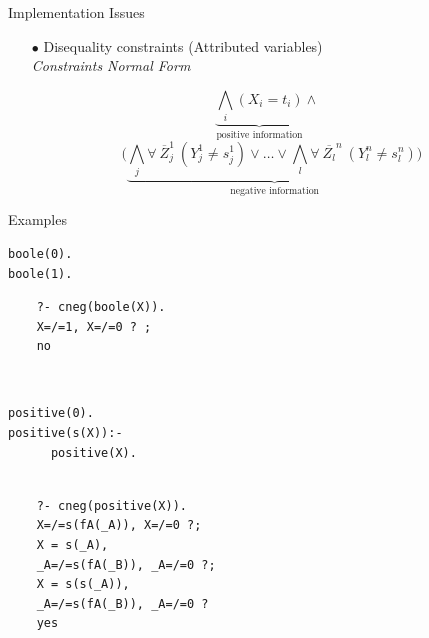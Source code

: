 \documentclass[pdf,slideColor,contemporain]{prosper}
\begin{document}
\begin{slide}{Implementation Issues}
     \begin{itemize}

        \item[$\bullet$] {\blue Disequality constraints} (Attributed
        variables) \\
        \emph{Constraints Normal Form}\\

\begin{small}

\[ \underbrace{\bigwedge_i (X_i = t_i)}_{\mbox{positive information}} \wedge~~~\] 
\[(
\underbrace{\bigwedge_j \forall~ \overline{Z}_j^1~(Y_j^1 \neq s_j^1)
\vee \ldots \vee \bigwedge_l \forall~ \overline{Z_l}^n~(Y_l^n \neq
s_l^n) )}_{\mbox{negative information}} \]


\end{small}

     \end{itemize}
\end{slide}
\begin{slide}{Examples}
\begin{small}

 \begin{minipage}{1.6in}
\begin{verbatim}
boole(0).
boole(1).
\end{verbatim}
\end{minipage}
\begin{minipage}{2in}
{\blue
\begin{verbatim} 
    ?- cneg(boole(X)).
    X=/=1, X=/=0 ? ;
    no
\end{verbatim} 
}
\end{minipage}\\
\vspace{0.5cm}
\begin{minipage}{1.6in}
\begin{verbatim}
positive(0). 
positive(s(X)):-
      positive(X).  
\end{verbatim}
\end{minipage}
\begin{minipage}{2in}
{\blue
\begin{verbatim} 

    ?- cneg(positive(X)).
    X=/=s(fA(_A)), X=/=0 ?;
    X = s(_A),
    _A=/=s(fA(_B)), _A=/=0 ?;
    X = s(s(_A)),
    _A=/=s(fA(_B)), _A=/=0 ? 
    yes
\end{verbatim} 
}
\end{minipage}

\end{small}

\end{slide}
\end{document}
